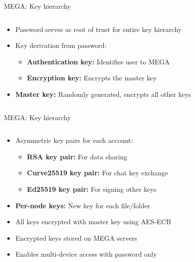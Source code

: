 \documentclass[aspectratio=169, lualatex, handout]{beamer}
\begin{document}
\begin{frame}{MEGA: Key hierarchy}
	\begin{columns}[c]
		\begin{column}{0.6\textwidth}
			\begin{itemize}
				\item Password serves as root of trust for entire key hierarchy
				\item Key derivation from password:
				      \begin{itemize}
					      \item \textbf{Authentication key:} Identifies user to MEGA
					      \item \textbf{Encryption key:} Encrypts the master key
				      \end{itemize}
				\item \textbf{Master key:} Randomly generated, encrypts all other keys
			\end{itemize}
		\end{column}
		\begin{column}{0.4\textwidth}
		\end{column}
	\end{columns}
\end{frame}

\begin{frame}{MEGA: Key hierarchy}
	\begin{columns}[c]
		\begin{column}{0.6\textwidth}
			\begin{itemize}
				\item Asymmetric key pairs for each account:
				      \begin{itemize}
					      \item \textbf{RSA key pair:} For data sharing
					      \item \textbf{Curve25519 key pair:} For chat key exchange
					      \item \textbf{Ed25519 key pair:} For signing other keys
				      \end{itemize}
				\item \textbf{Per-node keys:} New key for each file/folder
				\item All keys encrypted with master key using AES-ECB
				\item Encrypted keys stored on MEGA servers
				\item Enables multi-device access with password only
			\end{itemize}
		\end{column}
		\begin{column}{0.4\textwidth}
		\end{column}
	\end{columns}
\end{frame}
\end{document}
